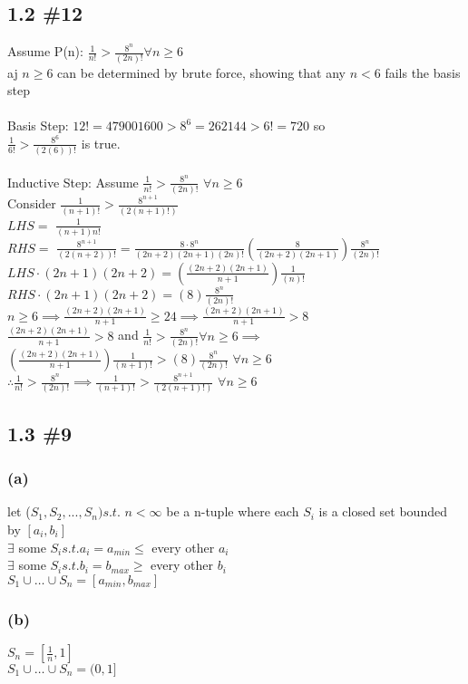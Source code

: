 \documentclass[12pt]{article}
\begin{document}
\subsection{1.2 \#12}
Assume P(n): $\frac{1}{n!} > \frac{8^{n}}{(2n)!} \forall n \ge 6$ \\aj
$n \ge 6$ can be determined by brute force, showing that any $n < 6$ fails the basis step \\
\\
Basis Step: $12! = 479001600 > 8^{6} = 262144 > 6! = 720$ so \\
$\frac{1}{6!} > \frac{8^{6}}{(2(6))!}$ is true. \\
\\
Inductive Step: Assume $\frac{1}{n!} > \frac{8^{n}}{(2n)!}$  $\forall n \ge 6$ \\
Consider $\frac{1}{(n+1)!} > \frac{8^{n+1}}{(2(n+1)!)}$ \\
$LHS = $ $\frac{1}{(n+1)n!}$ \\ 
$RHS =$ $\frac{8^{n+1}}{(2(n+2))!} = \frac{8 \cdot 8^{n}}{(2n+2)(2n+1)(2n)!} (\frac{8}{(2n+2)(2n+1)})\frac{8^{n}}{(2n)!}$ \\
$LHS \cdot (2n+1)(2n+2) = (\frac{(2n+2)(2n+1)}{n+1})\frac{1}{(n)!}$ \\
$RHS \cdot (2n+1)(2n+2) = (8) \frac{8^{n}}{(2n)!}$ \\
$n \ge 6 \implies \frac{(2n+2)(2n+1)}{n+1} \ge 24 \implies \frac{(2n+2)(2n+1)}{n+1} > 8$ \\
 $\frac{(2n+2)(2n+1)}{n+1} > 8$ and $\frac{1}{n!} > \frac{8^{n}}{(2n)!} \forall n \ge 6 \implies$ \\
$(\frac{(2n+2)(2n+1)}{n+1})\frac{1}{(n+1)!} > (8) \frac{8^{n}}{(2n)!} $  $\forall n \ge 6$ \\
$\therefore \frac{1}{n!} > \frac{8^{n}}{(2n)!} \implies \frac{1}{(n+1)!} > \frac{8^{n+1}}{(2(n+1)!)}$  $\forall n \ge 6$

\subsection{1.3 \#9}
\subsubsection{(a)}
let ($S_{1}, S_{2}, ... , S_{n}) s.t.$ $ n < \infty$ be a n-tuple where each $S_{i}$ is a closed set bounded by $[a_{i}, b_{i}]$ \\
$\exists$ some $S_{i} s.t. a_{i} = a_{min} \le$ every other $a_{i}$ \\
$\exists$ some $S_{i} s.t. b_{i} = b_{max} \ge$ every other $b_{i}$ \\
$S_{1} \cup \dots \cup S_{n}  = [a_{min}, b_{max}]$
\subsubsection{(b)}
$S_{n} = [\frac{1}{n}, 1]$ \\
$S_{1} \cup \dots \cup S_{n} = (0, 1]$
\end{document}
